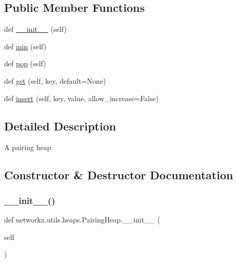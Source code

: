\subsection*{Public Member Functions}
\begin{DoxyCompactItemize}
\item 
def \hyperlink{classnetworkx_1_1utils_1_1heaps_1_1PairingHeap_a3acff663553ed22d32aa12444f496b54}{\+\_\+\+\_\+init\+\_\+\+\_\+} (self)
\item 
def \hyperlink{classnetworkx_1_1utils_1_1heaps_1_1PairingHeap_aea88529e45537fd1a6991936610ebbe2}{min} (self)
\item 
def \hyperlink{classnetworkx_1_1utils_1_1heaps_1_1PairingHeap_a157ec3fcff5a613899477a9568459885}{pop} (self)
\item 
def \hyperlink{classnetworkx_1_1utils_1_1heaps_1_1PairingHeap_ae8bcaa5d8b4ac31e9c599ac6d58d087b}{get} (self, key, default=None)
\item 
def \hyperlink{classnetworkx_1_1utils_1_1heaps_1_1PairingHeap_aee48243e858e406b87d5d4a56c82d0e3}{insert} (self, key, value, allow\+\_\+increase=False)
\end{DoxyCompactItemize}


\subsection{Detailed Description}
\begin{DoxyVerb}A pairing heap.\end{DoxyVerb}
 

\subsection{Constructor \& Destructor Documentation}
\mbox{\label{classnetworkx_1_1utils_1_1heaps_1_1PairingHeap_a3acff663553ed22d32aa12444f496b54}} 
\subsubsection{\texorpdfstring{\+\_\+\+\_\+init\+\_\+\+\_\+()}{\_\_init\_\_()}}
{\footnotesize\ttfamily def networkx.\+utils.\+heaps.\+Pairing\+Heap.\+\_\+\+\_\+init\+\_\+\+\_\+ (\begin{DoxyParamCaption}\item[{}]{self }\end{DoxyParamCaption})}

